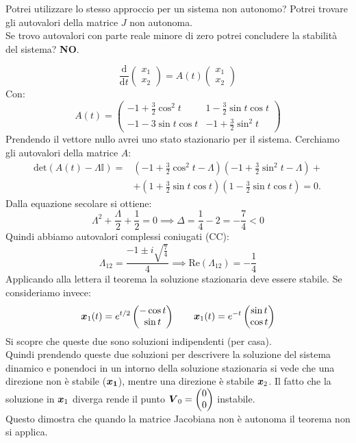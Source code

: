 Potrei utilizzare lo stesso approccio per un sistema non autonomo? Potrei trovare gli autovalori della matrice $J$ non autonoma. \\
Se trovo autovalori con parte reale minore di zero potrei concludere la stabilità del sistema? \textbf{NO}.
\begin{exmp}
    \[
	\frac{\text{d} }{\text{d} t} \begin{pmatrix} x_1 \\ x_2 \end{pmatrix} = A(t)\begin{pmatrix} x_1 \\ x_2 \end{pmatrix} 
    \] 
    Con:
    \[
	A(t) = 
	\begin{pmatrix} 
	    -1 + \frac{3}{2}\cos^2t & 1- \frac{3}{2}\sin t\cos t \\
	    -1 -3\sin t \cos t & -1 + \frac{3}{2}\sin^2t
	\end{pmatrix} 
    \] 
    Prendendo il vettore nullo avrei uno stato stazionario per il sistema. Cerchiamo gli autovalori della matrice $A$:
    \[\begin{aligned}
	\text{det}(A(t)- \Lambda  \mathbb{I}) =& (-1 + \frac{3}{2}\cos^2t - \Lambda)(-1+\frac{3}{2}\sin^2t -\Lambda)+\\
					       &+(1+\frac{3}{2}\sin t\cos t)(1-\frac{3}{2}\sin t\cos t)=0
    .\end{aligned}\]
    Dalla equazione secolare si ottiene:
    \[
        \Lambda^2 + \frac{\Lambda}{2}+\frac{1}{2}=0 \implies  \Delta  = \frac{1}{4}-2 = -\frac{7}{4} <0
    \] 
    Quindi abbiamo autovalori complessi coniugati (CC):
    \[
	\Lambda_{12} = \frac{-1 \pm i \sqrt{\frac{7}{4}}}{4} \implies  \text{Re}(\Lambda_{12})=-\frac{1}{4}
    \] 
    Applicando alla lettera il teorema la soluzione stazionaria deve essere stabile. Se consideriamo invece:
    \[
	\boldsymbol{x}_1(t)=e^{t /2}\begin{pmatrix} -\cos t \\ \sin t \end{pmatrix}  \qquad \boldsymbol{x}_1(t)=e^{-t}\begin{pmatrix} \sin t \\ \cos t \end{pmatrix} 
    \] 
    Si scopre che queste due sono soluzioni indipendenti (per casa). \\
    Quindi prendendo queste due soluzioni per descrivere la soluzione del sistema dinamico e ponendoci in un intorno della soluzione stazionaria si vede che una direzione non è stabile ($\boldsymbol{x_1}$), mentre una direzione è stabile $\boldsymbol{x}_2$. Il fatto che la soluzione in $\boldsymbol{x}_1$ diverga rende il punto $\boldsymbol{V}_0 = \begin{pmatrix} 0\\ 0 \end{pmatrix} $ instabile. \\
   Questo dimostra che quando la matrice Jacobiana non è autonoma il teorema non si applica.
\end{exmp}
